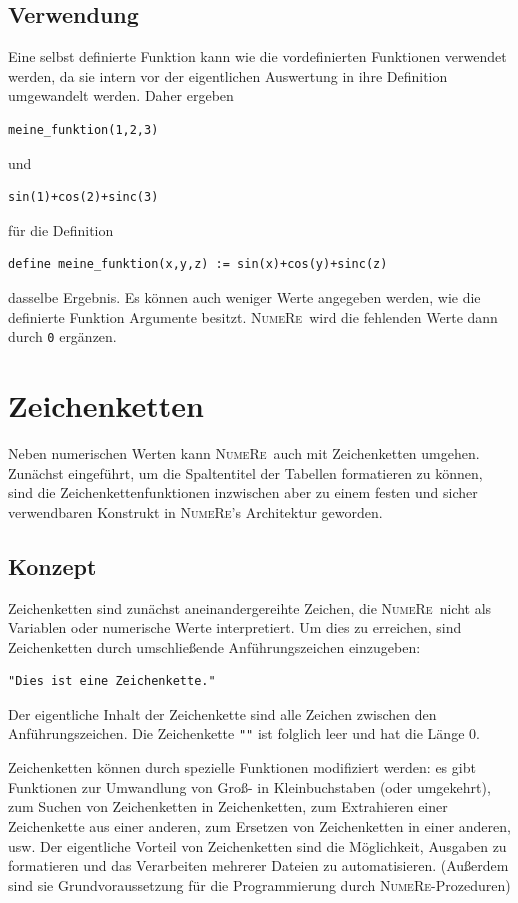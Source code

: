 \documentclass[DIV=14,headsepline,footsepline]{scrbook}
\newcommand{\NR}{\textsc{Nu\-me\-Re}}
\begin{document}
			\section{Verwendung}
				Eine selbst definierte Funktion kann wie die vordefinierten Funktionen verwendet werden, da sie intern vor der eigentlichen Auswertung in ihre Definition umgewandelt werden. Daher ergeben
				\begin{lstlisting}
meine_funktion(1,2,3)
				\end{lstlisting}
				und 
				\begin{lstlisting}
sin(1)+cos(2)+sinc(3)
				\end{lstlisting}
				für die Definition
				\begin{lstlisting}
define meine_funktion(x,y,z) := sin(x)+cos(y)+sinc(z)
				\end{lstlisting}
				dasselbe Ergebnis. Es können auch weniger Werte angegeben werden, wie die definierte Funktion Argumente besitzt. \NR\ wird die fehlenden Werte dann durch \verb+0+ ergänzen.
		\chapter{Zeichenketten}
			Neben numerischen Werten kann \NR\ auch mit Zeichenketten umgehen. Zunächst eingeführt, um die Spaltentitel der Tabellen formatieren zu können, sind die Zeichenkettenfunktionen inzwischen aber zu einem festen und sicher verwendbaren Konstrukt in \NR's Architektur geworden.
			\section{Konzept}
				Zeichenketten sind zunächst aneinandergereihte Zeichen, die \NR\ nicht als Variablen oder numerische Werte interpretiert. Um dies zu erreichen, sind Zeichenketten durch umschließende Anführungszeichen einzugeben:
				\begin{lstlisting}
"Dies ist eine Zeichenkette."
				\end{lstlisting}
				Der eigentliche Inhalt der Zeichenkette sind alle Zeichen zwischen den Anführungszeichen. Die Zeichenkette \verb+""+ ist folglich leer und hat die Länge 0.
				
				Zeichenketten können durch spezielle Funktionen modifiziert werden: es gibt Funktionen zur Umwandlung von Groß- in Kleinbuchstaben (oder umgekehrt), zum Suchen von Zeichenketten in Zeichenketten, zum Extrahieren einer Zeichenkette aus einer anderen, zum Ersetzen von Zeichenketten in einer anderen, usw. Der eigentliche Vorteil von Zeichenketten sind die Möglichkeit, Ausgaben zu formatieren und das Verarbeiten mehrerer Dateien zu automatisieren. (Außerdem sind sie Grundvoraussetzung für die Programmierung durch \NR-Prozeduren)
				
\end{document}
